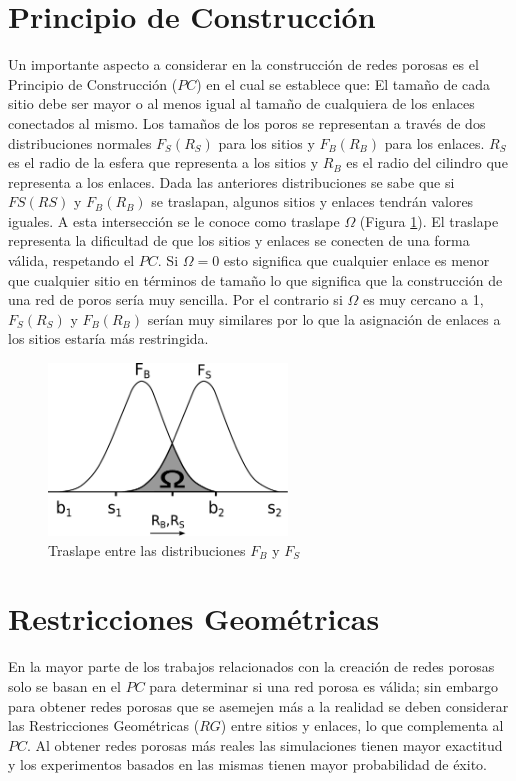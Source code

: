 \section{Principio de Construcción}
\label{sec:mpc}
Un importante aspecto a considerar en la construcción de redes porosas es el Principio de Construcción ($PC$) en el cual se establece que: El tamaño de cada sitio debe ser mayor o al menos igual al tamaño de cualquiera de los enlaces conectados al mismo. Los tamaños de los poros se representan a través de dos distribuciones normales $F_S(R_S)$ para los sitios y $F_B(R_B)$ para los enlaces. $R_S$ es el radio de la esfera que representa a los sitios y $R_B$ es el radio del cilindro que representa a los enlaces. Dada las anteriores distribuciones se sabe que si $FS(RS)$ y $F_B(R_B)$ se traslapan, algunos sitios y enlaces tendrán valores iguales. A esta intersección se le conoce como traslape $\Omega$ (Figura \ref{fig:overlap}). El traslape representa la dificultad de que los sitios y enlaces se conecten de una forma válida, respetando el $PC$. Si $\Omega=0$ esto significa que cualquier enlace es menor que cualquier sitio en términos de tamaño lo que significa que la construcción de una red de poros sería muy sencilla. Por el contrario si $\Omega$ es muy cercano a 1, $F_S(R_S)$ y $F_B(R_B)$ serían muy similares por lo que la asignación de enlaces a los sitios estaría más restringida.\\

\begin{figure}[hbtp]
\centering
\includegraphics[width=2.5in]{img/traslape.pdf}
\caption{Traslape entre las distribuciones \textit{$F_B$} y $F_S$}
\label{fig:overlap}
\end{figure}

\section{Restricciones Geométricas}
\label{sec:mgr}

En la mayor parte de los trabajos relacionados con la creación de redes porosas solo se basan en el $PC$ para determinar si una red porosa es válida; sin embargo para obtener redes porosas que se asemejen más a la realidad se deben considerar las Restricciones Geométricas ($RG$) entre sitios y enlaces, lo que complementa al $PC$. Al obtener redes porosas más reales las simulaciones tienen mayor exactitud y los experimentos basados en las mismas tienen mayor probabilidad de éxito.\\

